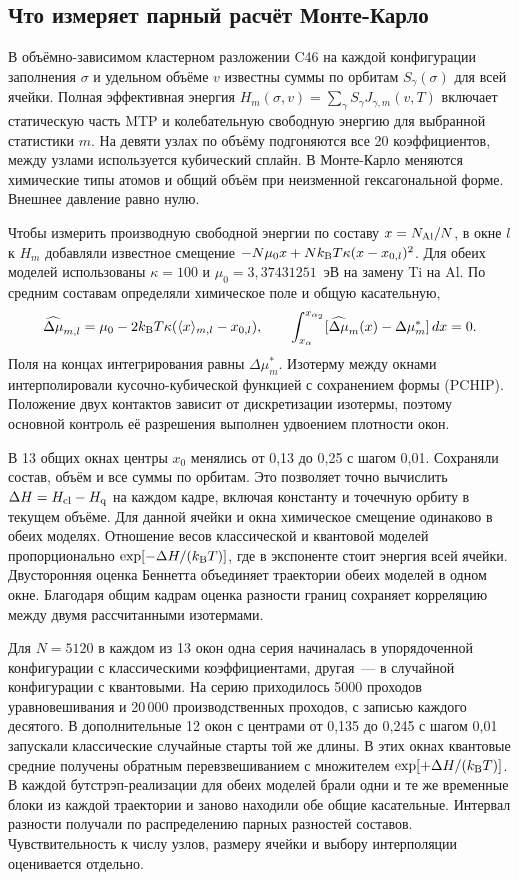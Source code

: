 \subsection*{Что измеряет парный расчёт Монте-Карло}

В объёмно-зависимом кластерном разложении C46 на каждой конфигурации
заполнения \(\sigma\) и удельном объёме \(v\) известны суммы по орбитам
\(S_\gamma(\sigma)\) для всей ячейки. Полная эффективная энергия
\(H_m(\sigma,v)=\sum_\gamma S_\gamma J_{\gamma,m}(v,T)\) включает
статическую часть MTP и колебательную свободную энергию для выбранной
статистики \(m\). На девяти узлах по объёму подгоняются все 20
коэффициентов, между узлами используется кубический сплайн.
В Монте-Карло меняются химические типы атомов и общий объём
при неизменной гексагональной форме. Внешнее давление равно нулю.

Чтобы измерить производную свободной энергии по составу \(x=N_{\rm Al}/N\),
в окне \(l\) к \(H_m\) добавляли известное смещение
\(-N\mu_0 x+Nk_{\rm B}T\kappa(x-x_{0,l})^2\).
Для обеих моделей использованы \(\kappa=100\) и
\(\mu_0=3{,}37431251\)~эВ на замену Ti на Al. По средним составам
определяли химическое поле и общую касательную,
\[
 \widehat{\Delta\mu}_{m,l}
 =\mu_0-2k_{\rm B}T\kappa(\langle x\rangle_{m,l}-x_{0,l}),\qquad
 \int_{x_\alpha}^{x_{\alpha_2}}
 [\widehat{\Delta\mu}_{m}(x)-\Delta\mu^*_m]\,dx=0 .
\]
Поля на концах интегрирования равны \(\Delta\mu_m^*\). Изотерму между
окнами интерполировали кусочно-кубической функцией с сохранением формы
(PCHIP). Положение двух контактов зависит от дискретизации изотермы,
поэтому основной контроль её разрешения выполнен удвоением плотности окон.

В 13 общих окнах центры \(x_0\) менялись от 0,13 до 0,25 с шагом
0,01. Сохраняли состав, объём и все суммы по орбитам. Это позволяет
точно вычислить \(\Delta H=H_{\rm cl}-H_{\rm q}\) на каждом кадре,
включая константу и точечную орбиту в текущем объёме.
Для данной ячейки и окна химическое смещение одинаково в обеих моделях.
Отношение весов классической и квантовой моделей пропорционально
\(\exp[-\Delta H/(k_{\rm B}T)]\), где в экспоненте стоит энергия
всей ячейки. Двусторонняя оценка Беннетта объединяет траектории
обеих моделей в одном окне. Благодаря общим кадрам оценка разности
границ сохраняет корреляцию между двумя рассчитанными изотермами.

Для \(N=5120\) в каждом из 13 окон одна серия начиналась в
упорядоченной конфигурации с классическими коэффициентами, другая~---
в случайной конфигурации с квантовыми. На серию приходилось 5000
проходов уравновешивания и 20\,000 производственных проходов, с
записью каждого десятого. В дополнительные 12 окон с центрами от
0,135 до 0,245 с шагом 0,01 запускали классические случайные старты
той же длины. В этих окнах квантовые средние получены обратным
перевзвешиванием с множителем \(\exp[+\Delta H/(k_{\rm B}T)]\).
В каждой бутстрэп-реализации для обеих моделей брали одни и те же
временные блоки из каждой траектории и заново находили обе общие
касательные. Интервал разности получали по распределению парных
разностей составов. Чувствительность к числу узлов, размеру ячейки
и выбору интерполяции оценивается отдельно.

